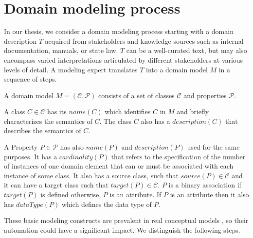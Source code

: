 \chapter{Domain modeling process}

In our thesis, we consider a domain modeling process starting with a domain description $T$ acquired from stakeholders and knowledge sources such as internal documentation, manuals, or state law. $T$ can be a well-curated text, but may also encompass varied interpretations articulated by different stakeholders at various levels of detail. A modeling expert translates $T$ into a domain model $M$ in a sequence of steps.

A domain model $M = (\mathcal{C}, \mathcal{P})$ consists of a set of classes $\mathcal{C}$ and properties $\mathcal{P}$.

A class $C \in \mathcal{C}$ has its $name(C)$ which identifies $C$ in $M$ and briefly characterizes the semantics of $C$. The class $C$ also has a $description(C)$ that describes the semantics of $C$.

A Property $P \in \mathcal{P}$ has also $name(P)$ and $description(P)$ used for the same purposes. It has a $cardinality(P)$ that refers to the specification of the number of instances of one domain element that can or must be associated with each instance of some class. It also has a source class, such that $source(P) \in \mathcal{C}$ and it can have a target class such that $target(P) \in \mathcal{C}$. $P$ is a binary association if $target(P)$ is defined otherwise, $P$ is an attribute. If $P$ is an attribute then it also has $dataType(P)$ which defines the data type of $P$.

These basic modeling constructs are prevalent in real conceptual models \cite{Keet2015}, so their automation could have a significant impact. We distinguish the following steps.



